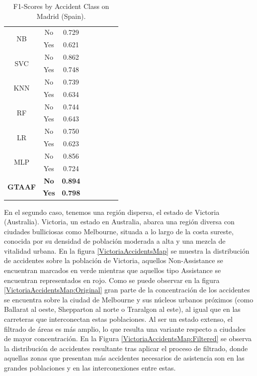 \documentclass{uathesis-es}
\begin{document}
{\begin{table}[H]
\begin{center}
\begin{tabular}{|c|c||c|c|c|c|c|c|}
        \multirow{2}{*}{NB} &
            No &  0.729 \\ &
		    Yes & 0.621 \\ \hline \hline
        \multirow{2}{*}{SVC} &
            No & 0.862 \\ &
		    Yes &  0.748 \\ \hline \hline
        \multirow{2}{*}{KNN} &
            No  & 0.739 \\ &
            Yes & 0.634 \\ \hline \hline
        \multirow{2}{*}{RF} &
            No & 0.744 \\ &
            Yes & 0.643  \\ \hline \hline
        \multirow{2}{*}{LR} &
            No &  0.750 \\ &
            Yes & 0.623 \\ \hline \hline
        \multirow{2}{*}{MLP} &
            No & 0.856 \\ &
            Yes & 0.724  \\ \hline \hline
        \multirow{2}{*}{\textbf{GTAAF}} &
            \textbf{No} & \textbf{0.894} \\ &
            \textbf{Yes} & \textbf{0.798} \\ \hline \hline
		\end{tabular}
	\end{center}
	\caption{F1-Scores by Accident Class on Madrid (Spain).}
	\label{SpainMetrics}
\end{table}

En el segundo caso, tenemos una región dispersa, el estado de Victoria (Australia). Victoria, un estado en Australia, abarca una región diversa con ciudades bulliciosas como Melbourne, situada a lo largo de la costa sureste, conocida por su densidad de población moderada a alta y una mezcla de vitalidad urbana. En la figura \ref{VictoriaAccidentsMap} se muestra la distribución de accidentes sobre la población de Victoria, aquellos Non-Assistance se encuentran marcados en verde mientras que aquellos tipo Assistance se encuentran representados en rojo. Como se puede observar en la figura \ref{VictoriaAccidentsMap:Original} gran parte de la concentración de los accidentes se encuentra sobre la ciudad de Melbourne y sus núcleos urbanos próximos (como Ballarat al oeste, Shepparton al norte o Traralgon al este), al igual que en las carreteras que interconectan estas poblaciones. Al ser un estado extenso, el filtrado de áreas es más amplio, lo que resulta una variante respecto a ciudades de mayor concentración. En la Figura \ref{VictoriaAccidentsMap:Filtered} se observa la distribución de accidentes resultante tras aplicar el proceso de filtrado, donde aquellas zonas que presentan más accidentes necesarios de asistencia son en las grandes poblaciones y en las interconexiones entre estas.


}
\end{document}
